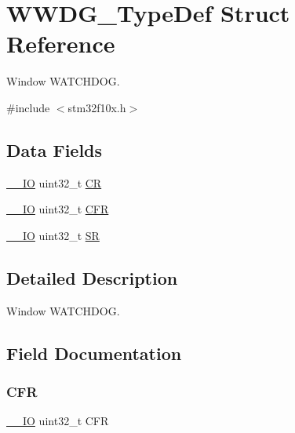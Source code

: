 \hypertarget{struct_w_w_d_g___type_def}{}\section{W\+W\+D\+G\+\_\+\+Type\+Def Struct Reference}
\label{struct_w_w_d_g___type_def}


Window W\+A\+T\+C\+H\+D\+OG.  




{\ttfamily \#include $<$stm32f10x.\+h$>$}

\subsection*{Data Fields}
\begin{DoxyCompactItemize}
\item 
\mbox{\hyperlink{core__sc300_8h_aec43007d9998a0a0e01faede4133d6be}{\+\_\+\+\_\+\+IO}} uint32\+\_\+t \mbox{\hyperlink{struct_w_w_d_g___type_def_ab40c89c59391aaa9d9a8ec011dd0907a}{CR}}
\item 
\mbox{\hyperlink{core__sc300_8h_aec43007d9998a0a0e01faede4133d6be}{\+\_\+\+\_\+\+IO}} uint32\+\_\+t \mbox{\hyperlink{struct_w_w_d_g___type_def_ac011ddcfe531f8e16787ea851c1f3667}{C\+FR}}
\item 
\mbox{\hyperlink{core__sc300_8h_aec43007d9998a0a0e01faede4133d6be}{\+\_\+\+\_\+\+IO}} uint32\+\_\+t \mbox{\hyperlink{struct_w_w_d_g___type_def_af6aca2bbd40c0fb6df7c3aebe224a360}{SR}}
\end{DoxyCompactItemize}


\subsection{Detailed Description}
Window W\+A\+T\+C\+H\+D\+OG. 

\subsection{Field Documentation}
\mbox{\label{struct_w_w_d_g___type_def_ac011ddcfe531f8e16787ea851c1f3667}} 
\subsubsection{\texorpdfstring{CFR}{CFR}}
{\footnotesize\ttfamily \mbox{\hyperlink{core__sc300_8h_aec43007d9998a0a0e01faede4133d6be}{\+\_\+\+\_\+\+IO}} uint32\+\_\+t C\+FR}

